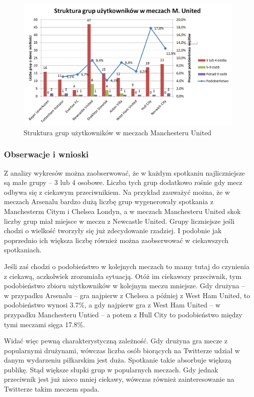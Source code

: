 \begin{figure}[ht!]
\centering
\includegraphics[width=160mm]{img/grupy-munited-nums.png}
\caption{Struktura grup użytkowników w meczach Manchesteru United}
\label{image:grupy-munited}
\end{figure}


\clearpage
\subsubsection{Obserwacje i wnioski}
Z analizy wykresów można zaobserwować, że w każdym spotkaniu najliczniejsze
są małe grupy -- 3 lub 4 osobowe. Liczba tych grup dodatkowo rośnie gdy
mecz odbywa się z ciekawym przeciwnikiem. Na przykład zauważyć można, że
w meczach Arsenalu bardzo dużą liczbę grup wygenerowały spotkania
z Manchesterm Citym i Chelsea Londyn, a w meczach Manchesteru United
skok liczby grup miał miejsce w meczu z Newcastle United.
Grupy liczniejsze jeśli chodzi o wielkość tworzyły się już zdecydowanie rzadziej.
I podobnie jak poprzednio ich większa liczbę również można zaobserwować
w ciekawszych spotkaniach.

Jeśli zaś chodzi o podobieństwo w kolejnych meczach to mamy tutaj do czynienia
z ciekawą, aczkolwiek zrozumiała sytuacją. Otóż im ciekawszy przeciwnik,
tym podobieństwo zbioru użytkowników w kolejnym meczu mniejsze.
Gdy drużyna -- w przypadku Arsenalu --  gra najpierw z Chelsea a później z 
West Ham United, to podobieństwo wynosi 3.7\%, a gdy najpierw gra z 
West Ham United -- w przypadku Manchesteru Untied -- a potem z Hull City
to podobieństwo między tymi meczami sięga 17.8\%.

Widać więc pewną charakterystyczną zależność. Gdy drużyna gra mecze z popularnymi
drużynami, wówczas liczba osób biorących na Twitterze udział w danym wydarzeniu
piłkarskim jest duża. Spotkanie takie absorbuje większą publikę. Stąd
większe słupki grup w popularnych meczach. Gdy jednak przeciwnik jest już nieco
mniej ciekawy, wówczas również zainteresowanie na Twitterze takim meczem spada.

